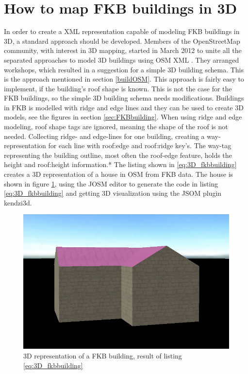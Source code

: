 \section{How to map FKB buildings in 3D}\label{sec:3D_OSM}
In order to create a XML representation capable of modeling FKB buildings in 3D, a standard approach should be developed. Members of the OpenStreetMap community, with interest in 3D mapping, started in March 2012 to unite all the separated approaches to model 3D buildings using OSM XML \cite{OpenStreetMapm}. They arranged workshops, which resulted in a suggestion for a simple 3D building schema. This is the approach mentioned in section \ref{buildOSM}. This approach is fairly easy to implement, if the building's roof shape is known. This is not the case for the FKB buildings, so the simple 3D building schema needs modifications. Buildings in FKB is modelled with ridge and edge lines and they can be used to create 3D models, see the figures in section \ref{sec:FKBbuilding}. When using ridge and edge modeling, roof shape tags are ignored, meaning the shape of the roof is not needed. Collecting ridge- and edge-lines for one building, creating a way-representation for each line with roof:edge and roof:ridge key's. The way-tag representing the building outline, most often the roof-edge feature, holds the height and roof:height information.*%
 The listing shown in \ref{eq:3D_fkbbuilding} creates a 3D representation of a house in OSM from FKB data. The house is shown in figure \ref{fig:3DFKBbuild}, using the JOSM editor to generate the code in listing \ref{eq:3D_fkbbuilding} and getting 3D visualization using the JSOM plugin kendzi3d. 

\begin{figure}[H]
    \centering
    \includegraphics[scale=0.5]{figures/FixedByMe/3DFKBbuilding.png}
    \caption{3D representation of a FKB building, result of listing \ref{eq:3D_fkbbuilding}}
    \label{fig:3DFKBbuild}
\end{figure}

